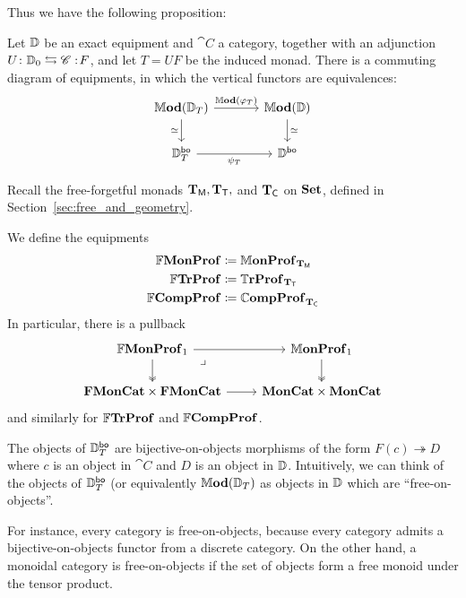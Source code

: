 \documentclass[12pt,oneside,article,draft]{memoir}
\begin{document}
Thus we have the following proposition:

\begin{proposition}\label{prop:object-free_Mod_bo}
   Let $\mathbb{D}$ be an exact equipment and $\cat{C}$ a category, together with an adjunction
   $U\colon\mathbb{D}_0\leftrightarrows\mathscr{C}:\!F$, and let $T=UF$ be the induced monad.  There is a
   commuting diagram of equipments, in which the vertical functors are equivalences:
   \begin{equation*}
      \begin{tikzcd}[column sep=large]
         \dMod(\dcat{D}_T) \ar[r,"\dMod(\varphi_T)"] \ar[d,"\equiv"']
            & \dMod(\dcat{D}) \ar[d,"\equiv"] \\
         \dcat{D}_T^{\bo} \ar[r,"\psi_T"'] & \dcat{D}^{\bo}
      \end{tikzcd}
   \end{equation*}
\end{proposition}

Recall the free-forgetful monads $\mathbf{T}_{\mathsf{M}},\mathbf{T}_{\mathsf{T}},$ and $\mathbf{T}_{\mathsf{C}}$ on $\mathbf{Set}$, defined in Section~\ref{sec:free_and_geometry}. 

\begin{definition}\label{def:FrMonProf_FrCompProf}
   We define the equipments
   \begin{align*}
      \mathbb{F}\mathbf{MonProf}&\coloneqq\mathbb{M}\mathbf{onProf}_{\mathbf{T}_{\mathsf{M}}} \\
      \mathbb{F}\mathbf{TrProf}&\coloneqq\mathbb{T}\mathbf{rProf}_{\mathbf{T}_{\mathsf{T}}} \\
      \mathbb{F}\mathbf{CompProf}&\coloneqq\mathbb{C}\mathbf{ompProf}_{\mathbf{T}_{\mathsf{C}}}
   \end{align*}
   In particular, there is a pullback
   \begin{equation*}
      \begin{tikzcd}
         \dFrMonProf_1 \ar[r] \ar[d,two heads] \ar[dr,phantom,"\lrcorner" very near start]
            & \dMonProf_1 \ar[d,two heads] \\
         \FrMonCat\times\FrMonCat \ar[r]
            & \MonCat\times\MonCat
      \end{tikzcd}
   \end{equation*}
   and similarly for $\mathbb{F}\mathbf{TrProf}$ and $\mathbb{F}\mathbf{CompProf}$.
\end{definition}

\begin{remark}
   The objects of $\mathbb{D}_T^{\mathsf{bo}}$ are bijective-on-objects morphisms of the form
   $F(c)\twoheadrightarrow D$ where $c$ is an object in $\cat{C}$ and $D$ is an object in
   $\mathbb{D}$. Intuitively, we can think of the objects of $\mathbb{D}_T^{\mathsf{bo}}$ (or equivalently
   $\mathbb{M}\mathbf{od}(\mathbb{D}_T)$ as objects in $\mathbb{D}$ which are ``free-on-objects''.
   
   For instance, every category is free-on-objects, because every category admits a
   bijective-on-objects functor from a discrete category. On the other hand, a monoidal category is
   free-on-objects if the set of objects form a free monoid under the tensor product.
\end{remark}
\end{document}
